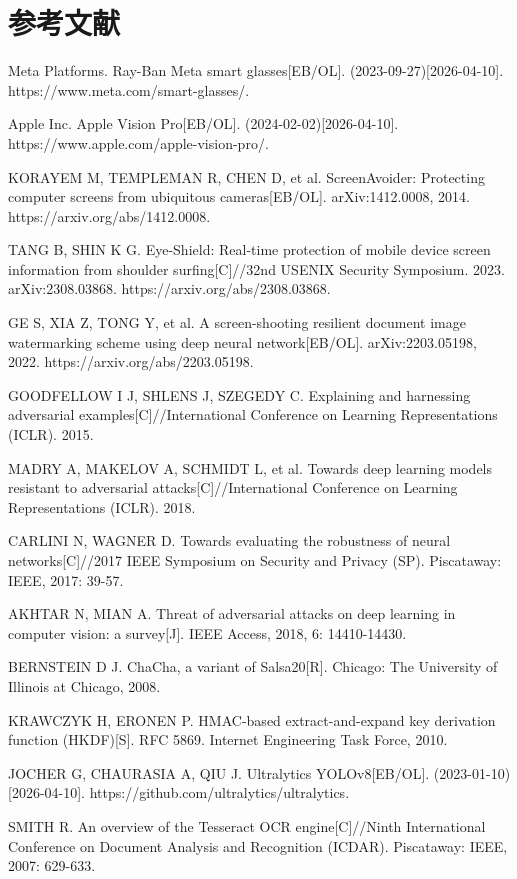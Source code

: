 \chapter*{参考文献}

\begingroup
{}
\setlength{\parindent}{0pt}
\linespread{1.3}\selectfont
\newcommand{\refitem}[2]{\noindent\makebox[8mm][l]{[#1]}\parbox[t]{\dimexpr\linewidth-8mm}{#2}\par\vspace{2pt}}

\refitem{1}{Meta Platforms. Ray-Ban Meta smart glasses[EB/OL]. (2023-09-27)[2026-04-10]. https://www.meta.com/smart-glasses/.}
\refitem{2}{Apple Inc. Apple Vision Pro[EB/OL]. (2024-02-02)[2026-04-10]. https://www.apple.com/apple-vision-pro/.}
\refitem{3}{KORAYEM M, TEMPLEMAN R, CHEN D, et al. ScreenAvoider: Protecting computer screens from ubiquitous cameras[EB/OL]. arXiv:1412.0008, 2014. https://arxiv.org/abs/1412.0008.}
\refitem{4}{TANG B, SHIN K G. Eye-Shield: Real-time protection of mobile device screen information from shoulder surfing[C]//32nd USENIX Security Symposium. 2023. arXiv:2308.03868. https://arxiv.org/abs/2308.03868.}
\refitem{5}{GE S, XIA Z, TONG Y, et al. A screen-shooting resilient document image watermarking scheme using deep neural network[EB/OL]. arXiv:2203.05198, 2022. https://arxiv.org/abs/2203.05198.}
\refitem{6}{GOODFELLOW I J, SHLENS J, SZEGEDY C. Explaining and harnessing adversarial examples[C]//International Conference on Learning Representations (ICLR). 2015.}
\refitem{7}{MADRY A, MAKELOV A, SCHMIDT L, et al. Towards deep learning models resistant to adversarial attacks[C]//International Conference on Learning Representations (ICLR). 2018.}
\refitem{8}{CARLINI N, WAGNER D. Towards evaluating the robustness of neural networks[C]//2017 IEEE Symposium on Security and Privacy (SP). Piscataway: IEEE, 2017: 39-57.}
\refitem{9}{AKHTAR N, MIAN A. Threat of adversarial attacks on deep learning in computer vision: a survey[J]. IEEE Access, 2018, 6: 14410-14430.}
\refitem{10}{BERNSTEIN D J. ChaCha, a variant of Salsa20[R]. Chicago: The University of Illinois at Chicago, 2008.}
\refitem{11}{KRAWCZYK H, ERONEN P. HMAC-based extract-and-expand key derivation function (HKDF)[S]. RFC 5869. Internet Engineering Task Force, 2010.}
\refitem{12}{JOCHER G, CHAURASIA A, QIU J. Ultralytics YOLOv8[EB/OL]. (2023-01-10)[2026-04-10]. https://github.com/ultralytics/ultralytics.}
\refitem{13}{SMITH R. An overview of the Tesseract OCR engine[C]//Ninth International Conference on Document Analysis and Recognition (ICDAR). Piscataway: IEEE, 2007: 629-633.}
